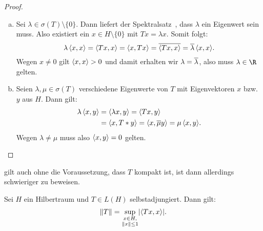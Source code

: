 \begin{proof}
    \begin{enumerate}[(a)]
        \item
            Sei $\lambda\in\sigma(T)\setminus\{0\}$. Dann liefert der
            Spektralsatz~, dass $\lambda$ ein Eigenwert
            sein muss. Also existiert ein $x\in H\setminus\{0\}$ mit $Tx=\lambda
            x$. Somit folgt:
            \[ \lambda \, \SP{x,x}
                = \SP{Tx,x} = \SP{x,Tx} = \ol{\SP{Tx,x}} 
                = \ol\lambda \, \SP{x,x}
            . \]
            Wegen $x\neq0$ gilt $\SP{x,x}>0$ und damit erhalten wir
            $\lambda=\overline\lambda$, also muss $\lambda\in\R$ gelten.
            
        \item
            Seien $\lambda,\mu\in\sigma(T)$ verschiedene Eigenwerte von $T$ mit
            Eigenvektoren $x$ bzw. $y$ aus $H$. Dann gilt:
            \begin{align*}
                \lambda\, \SP{x,y} &= \SP{\lambda x, y} = \SP{Tx,y} \\
                &= \SP{x,T*y} = \SP{x,\ol\mu y} = \mu \, \SP{x,y}
            . \end{align*}
            Wegen $\lambda\neq\mu$ muss also $\SP{x,y}=0$ gelten.
    \end{enumerate}
\end{proof}

\nnBemerkung
{} gilt auch ohne die Voraussetzung, dass $T$ kompakt ist,
ist dann allerdings schwieriger zu beweisen.

\begin{thSatz}
    Sei $H$ ein Hilbertraum und $T\in L(H)$ selbstadjungiert. Dann gilt:
    \[ \norm{T} = \sup_{\substack{x\in H,\\\norm{x}\leq1}}
        \abs{\SP{Tx,x}}  
    . \]
\end{thSatz}
